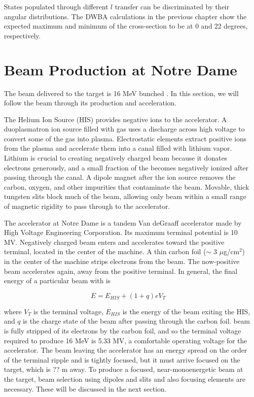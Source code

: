 States populated through different $l$ transfer can be discriminated by their angular distributions.  The DWBA calculations in the previous chapter show the expected maximum and minimum of the \zp cross-section to be at 0 and 22 degrees, respectively. 


\section{Beam Production at Notre Dame}
The beam delivered to the target is 16 MeV bunched .  In this section, we will follow the beam through its production and acceleration.

The Helium Ion Source (HIS) provides negative  ions to the accelerator.  A duoplasmatron ion source filled with  gas uses a discharge across high voltage to convert some of the gas into plasma.  Electrostatic elements extract positive  ions from the plasma and accelerate them into a canal filled with lithium vapor.  Lithium is crucial to creating negatively charged beam because it donates electrons generously, and a small fraction of the  becomes negatively ionized after passing through the canal.  A dipole magnet after the ion source removes the carbon, oxygen, and other impurities that contaminate the  beam.  Movable, thick tungsten slits block much of the beam, allowing only beam within a small range of magnetic rigidity to pass through to the accelerator.

The accelerator at Notre Dame is a tandem Van deGraaff accelerator made by High Voltage Engineering Corporation.  Its maximum terminal potential is 10 MV.  Negatively charged beam enters and accelerates toward the positive terminal, located in the center of the machine. A thin carbon foil ($\sim$ 3 $\mu$g/cm$^2$) in the center of the machine strips electrons from the beam.  The now-positive beam accelerates again, away from the positive terminal. In general, the final energy of a particular beam with is 

\begin{equation}
E = E_{HIS} + (1+q)eV_T
\end{equation}

where $V_T$ is the terminal voltage, $E_{HIS}$ is the energy of the beam exiting the HIS, and $q$ is the charge state of the beam after passing through the carbon foil.   beam is fully stripped of its electrons by the carbon foil, and so the terminal voltage required to produce 16 MeV  is 5.33 MV, a comfortable operating voltage for the accelerator.  The beam leaving the accelerator has an energy spread on the order of the terminal ripple and is tightly focused, but it must arrive focused on the target, which is ?? m away.  To produce a focused, near-monoenergetic beam at the target, beam selection using dipoles and slits and also focusing elements are necessary.  These will be discussed in the next section.


